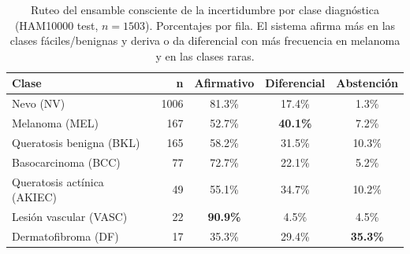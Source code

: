 \documentclass[11pt, a4paper]{article}
\begin{document}
\begin{table}[H]
  \centering
  \caption{Ruteo del ensamble consciente de la incertidumbre por clase diagnóstica (HAM10000 test,
  $n=1503$). Porcentajes por fila. El sistema afirma más en las
  clases fáciles/benignas y deriva o da diferencial con más frecuencia en melanoma y en las clases raras.}
  \label{tab:ruteo_clase}
  \begin{tabular}{lrccc}
    \toprule
    \textbf{Clase} & \textbf{n} & \textbf{Afirmativo} & \textbf{Diferencial} & \textbf{Abstención} \\
    \midrule
    Nevo (NV)                  & 1006 & 81.3\% & 17.4\% & 1.3\% \\
    Melanoma (MEL)             & 167  & 52.7\% & \textbf{40.1\%} & 7.2\% \\
    Queratosis benigna (BKL)   & 165  & 58.2\% & 31.5\% & 10.3\% \\
    Basocarcinoma (BCC)        & 77   & 72.7\% & 22.1\% & 5.2\% \\
    Queratosis actínica (AKIEC)& 49   & 55.1\% & 34.7\% & 10.2\% \\
    Lesión vascular (VASC)     & 22   & \textbf{90.9\%} & 4.5\% & 4.5\% \\
    Dermatofibroma (DF)        & 17   & 35.3\% & 29.4\% & \textbf{35.3\%} \\
    \bottomrule
  \end{tabular}
\end{table}
\end{document}
